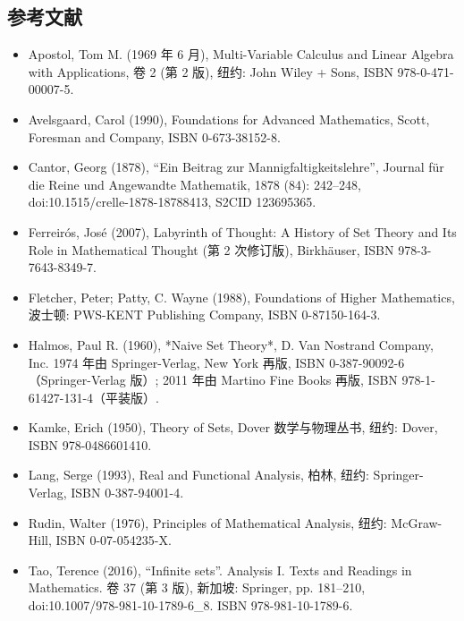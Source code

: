 \subsection{参考文献}
\begin{itemize}
\item Apostol, Tom M. (1969 年 6 月), Multi-Variable Calculus and Linear Algebra with Applications, 卷 2 (第 2 版), 纽约: John Wiley + Sons, ISBN 978-0-471-00007-5.
\item Avelsgaard, Carol (1990), Foundations for Advanced Mathematics, Scott, Foresman and Company, ISBN 0-673-38152-8.
\item Cantor, Georg (1878), “Ein Beitrag zur Mannigfaltigkeitslehre”, Journal für die Reine und Angewandte Mathematik, 1878 (84): 242–248, doi:10.1515/crelle-1878-18788413, S2CID 123695365.
\item Ferreirós, José (2007), Labyrinth of Thought: A History of Set Theory and Its Role in Mathematical Thought (第 2 次修订版), Birkhäuser, ISBN 978-3-7643-8349-7.
\item Fletcher, Peter; Patty, C. Wayne (1988), Foundations of Higher Mathematics, 波士顿: PWS-KENT Publishing Company, ISBN 0-87150-164-3.
\item Halmos, Paul R. (1960), *Naive Set Theory*, D. Van Nostrand Company, Inc. 1974 年由 Springer-Verlag, New York 再版, ISBN 0-387-90092-6（Springer-Verlag 版）; 2011 年由 Martino Fine Books 再版, ISBN 978-1-61427-131-4（平装版）.
\item Kamke, Erich (1950), Theory of Sets, Dover 数学与物理丛书, 纽约: Dover, ISBN 978-0486601410.
\item Lang, Serge (1993), Real and Functional Analysis, 柏林, 纽约: Springer-Verlag, ISBN 0-387-94001-4.
\item Rudin, Walter (1976), Principles of Mathematical Analysis, 纽约: McGraw-Hill, ISBN 0-07-054235-X.
\item Tao, Terence (2016), “Infinite sets”. Analysis I. Texts and Readings in Mathematics. 卷 37 (第 3 版), 新加坡: Springer, pp. 181–210, doi:10.1007/978-981-10-1789-6\_8. ISBN 978-981-10-1789-6.
\end{itemize}



